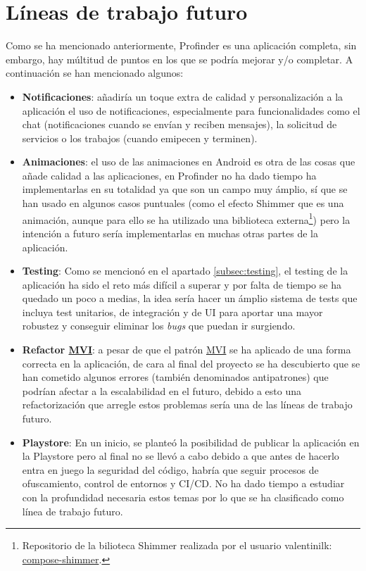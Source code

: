 \section{Líneas de trabajo futuro}
Como se ha mencionado anteriormente, Profinder es una aplicación completa, sin embargo, hay múltitud de puntos en los que se podría mejorar y/o completar. A continuación se han mencionado algunos:
\begin{itemize}
    \item \textbf{Notificaciones}: añadiría un toque extra de calidad y personalización a la aplicación el uso de notificaciones, especialmente para funcionalidades como el chat (notificaciones cuando se envían y reciben mensajes), la solicitud de servicios o los trabajos (cuando emipecen y terminen).
    \item \textbf{Animaciones}: el uso de las animaciones en Android es otra de las cosas que añade calidad a las aplicaciones, en Profinder no ha dado tiempo ha implementarlas en su totalidad ya que son un campo muy ámplio, sí que se han usado en algunos casos puntuales (como el efecto Shimmer que es una animación, aunque para ello se ha utilizado una biblioteca externa\footnote{Repositorio de la bilioteca Shimmer realizada por el usuario valentinilk: \href{https://github.com/valentinilk/compose-shimmer}{compose-shimmer}.}) pero la intención a futuro sería implementarlas en muchas otras partes de la aplicación.
    \item \textbf{Testing}: Como se mencionó en el apartado \ref{subsec:testing}, el testing de la aplicación ha sido el reto más difícil a superar y por falta de tiempo se ha quedado un poco a medias, la idea sería hacer un ámplio sistema de tests que incluya test unitarios, de integración y de UI para aportar una mayor robustez y conseguir eliminar los \textit{bugs} que puedan ir surgiendo.
    \item \textbf{Refactor  \hyperlink{subsec:mvi}{MVI}}: a pesar de que el patrón \hyperlink{subsec:mvi}{MVI} se ha aplicado de una forma correcta en la aplicación, de cara al final del proyecto se ha descubierto que se han cometido algunos errores (también denominados antipatrones) que podrían afectar a la escalabilidad en el futuro, debido a esto una refactorización que arregle estos problemas sería una de las líneas de trabajo futuro.
    \item \textbf{Playstore}: En un inicio, se planteó la posibilidad de publicar la aplicación en la Playstore pero al final no se llevó a cabo debido a que antes de hacerlo entra en juego la seguridad del código, habría que seguir procesos de ofuscamiento, control de entornos y CI/CD. No ha dado tiempo a estudiar con la profundidad necesaria estos temas por lo que se ha clasificado como línea de trabajo futuro.

\end{itemize}

